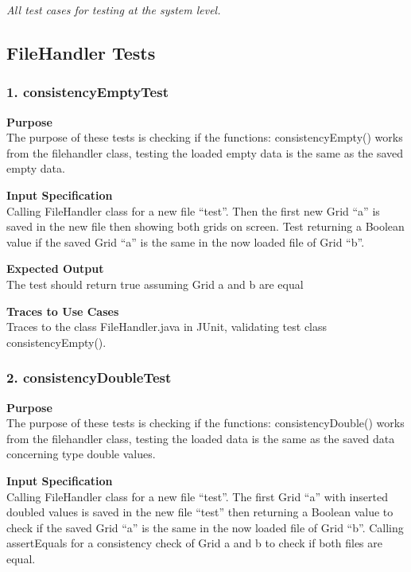 \documentclass[12pt]{article}
\begin{document}
{\it
All test cases for testing at the system level.
}
\subsection{FileHandler Tests}
\subsubsection{1. consistencyEmptyTest} \label{tc:1}

\noindent
{\bf Purpose}\\
The purpose of these tests is checking if the functions: consistencyEmpty() works from the filehandler class, testing the loaded empty data is the same as the saved empty data.

\noindent
{\bf Input Specification}\\
Calling FileHandler class for a new file “test”.  Then the first new Grid “a” is saved in the new file then showing both grids on screen. Test returning a Boolean value if the saved Grid “a” is the same in the now loaded file of Grid “b”.

\noindent
{\bf Expected Output}\\
The test should return true assuming Grid a and b are equal

\noindent
{\bf Traces to Use Cases}\\
Traces to the class FileHandler.java in JUnit, validating test class consistencyEmpty().
\subsubsection{2. consistencyDoubleTest} \label{tc:1}

\noindent
{\bf Purpose}\\
The purpose of these tests is checking if the functions: consistencyDouble() works from the filehandler class, testing the loaded data is the same as the saved data concerning type double values.

\noindent
{\bf Input Specification}\\
Calling FileHandler class for a new file “test”.  The first Grid “a” with inserted doubled values is saved in the new file “test” then returning a Boolean value to check if the saved Grid “a” is the same in the now loaded file of Grid “b”.  Calling assertEquals for a consistency check of Grid a and b to check if both files are equal.
\end{document}
